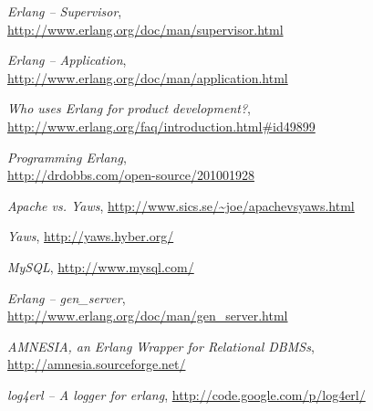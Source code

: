 \begin{thebibliography}{3}


 \emph{Erlang -- Supervisor}, \\
  \url{http://www.erlang.org/doc/man/supervisor.html}

 \emph{Erlang -- Application}, \\
  \url{http://www.erlang.org/doc/man/application.html}

 \emph{Who uses Erlang for product development?}, \\
  \url{http://www.erlang.org/faq/introduction.html#id49899}

 \emph{Programming Erlang}, \\
  \url{http://drdobbs.com/open-source/201001928}

 \emph{Apache vs. Yaws}, \url{http://www.sics.se/~joe/apachevsyaws.html}

 \emph{Yaws}, \url{http://yaws.hyber.org/}

 \emph{MySQL}, \url{http://www.mysql.com/}

 \emph{Erlang -- gen\_server}, \\
  \url{http://www.erlang.org/doc/man/gen_server.html}

 \emph{AMNESIA, an Erlang Wrapper for Relational DBMSs}, \\
  \url{http://amnesia.sourceforge.net/}

 \emph{log4erl -- A logger for erlang}, \url{http://code.google.com/p/log4erl/}








\end{thebibliography}
